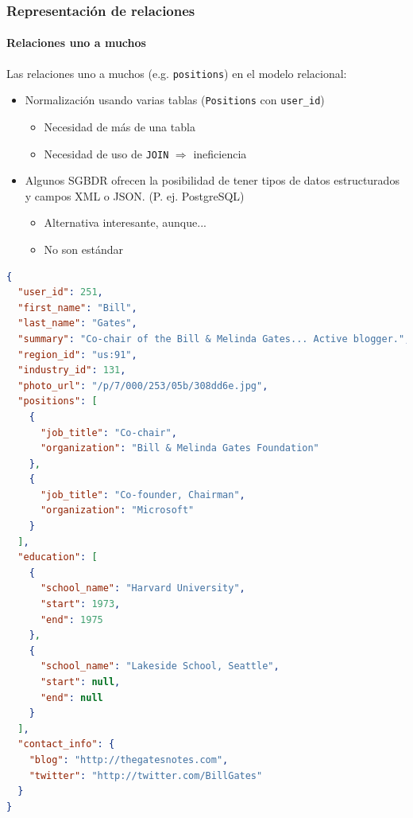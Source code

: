 \documentclass[14pt]{beamer}
\begin{document}
\begin{frame}
  \frametitle{Representación de relaciones}
  \framesubtitle{Relaciones uno a muchos}

  Las relaciones uno a muchos (e.g. {\tt positions}) en el modelo
  relacional:

\begin{itemize}
\item Normalización usando varias tablas ({\tt Positions} con
  {\tt user\_id})
  \begin{itemize}
  \item Necesidad de más de una tabla
  \item Necesidad de uso de {\tt JOIN} $\Rightarrow$ ineficiencia
  \end{itemize}
\item Algunos SGBDR ofrecen la posibilidad de tener tipos de datos
  estructurados y campos XML o JSON. (P. ej. PostgreSQL)
  \begin{itemize}
  \item Alternativa interesante, aunque...
  \item No son estándar
  \end{itemize}
\end{itemize}
\end{frame}

\begin{frame}
\begin{lstlisting}[language=json,basicstyle=\tiny\tt]
{
  "user_id": 251,
  "first_name": "Bill",
  "last_name": "Gates",
  "summary": "Co-chair of the Bill & Melinda Gates... Active blogger.",
  "region_id": "us:91",
  "industry_id": 131,
  "photo_url": "/p/7/000/253/05b/308dd6e.jpg",
  "positions": [
    {
      "job_title": "Co-chair",
      "organization": "Bill & Melinda Gates Foundation"
    },
    {
      "job_title": "Co-founder, Chairman",
      "organization": "Microsoft"
    }
  ],
  "education": [
    {
      "school_name": "Harvard University",
      "start": 1973,
      "end": 1975
    },
    {
      "school_name": "Lakeside School, Seattle",
      "start": null,
      "end": null
    }
  ],
  "contact_info": {
    "blog": "http://thegatesnotes.com",
    "twitter": "http://twitter.com/BillGates"
  }
}
\end{lstlisting}
\end{frame}
\end{document}
